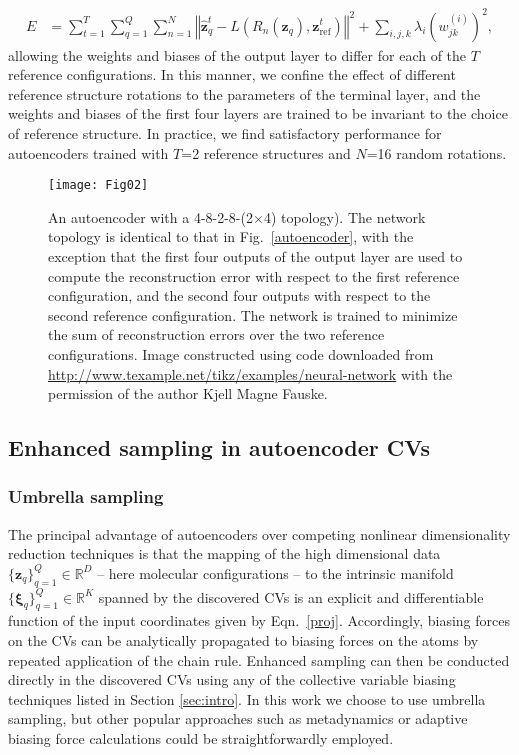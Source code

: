 \documentclass[12pt]{article}
\newcommand*{\blauw}[1]{#1}
\begin{document}
\begin{align}\label{err_3}
E &= \sum_{t=1}^T \sum_{q=1}^Q \sum_{n=1}^N \left\Vert \hat{\mathbf{z}}_q^t - L \left( R_n \left( \mathbf{z}_q \right) ,  \mathbf{z}_\mathrm{ref}^t \right) \right\Vert^2 + \sum_{i,j,k} \lambda_i \left( w_{jk}^{(i)} \right)^2,
\end{align}
allowing the weights and biases of the output layer to differ for each of the $T$ reference configurations. In this manner, we confine the effect of different reference structure rotations to the parameters of the terminal layer, and the weights and biases of the first four layers are trained to be invariant to the choice of reference structure. In practice, we find satisfactory performance for autoencoders trained with $T$=2 reference structures and $N$=16 random rotations.

\begin{figure}[ht!]
\begin{center}
\texttt{[image: Fig02]}
\caption{An autoencoder with a 4-8-2-8-(2$\times$4) topology). The network topology is identical to that in \blauw{Fig.~\ref{autoencoder}}, with the exception that the first four outputs of the output layer are used to compute the reconstruction error with respect to the first reference configuration, and the second four outputs with respect to the second reference configuration. The network is trained to minimize the sum of reconstruction errors over the two reference configurations. Image constructed using code downloaded from \url{http://www.texample.net/tikz/examples/neural-network} with the permission of the author Kjell Magne Fauske.} \label{autoencoder_ref_2}
\end{center}
\end{figure}



\subsection{\sffamily \large Enhanced sampling in autoencoder CVs}

\subsubsection{\sffamily \normalsize Umbrella sampling}

The principal advantage of autoencoders over competing nonlinear dimensionality reduction techniques is that the mapping of the high dimensional data $\{\mathbf{z}_q\}_{q=1}^Q \in \mathbb{R}^D$ -- here molecular configurations -- to the intrinsic manifold $\{\boldsymbol\xi_q\}_{q=1}^Q \in \mathbb{R}^K$ spanned by the discovered CVs is an explicit and differentiable function of the input coordinates given by \blauw{Eqn.~\ref{proj}}. Accordingly, biasing forces on the CVs can be analytically propagated to biasing forces on the atoms by repeated application of the chain rule. Enhanced sampling can then be conducted directly in the discovered CVs using any of the collective variable biasing techniques listed in \blauw{Section \ref{sec:intro}}. In this work we choose to use umbrella sampling, but other popular approaches such as metadynamics or adaptive biasing force calculations could be straightforwardly employed.
\end{document}
